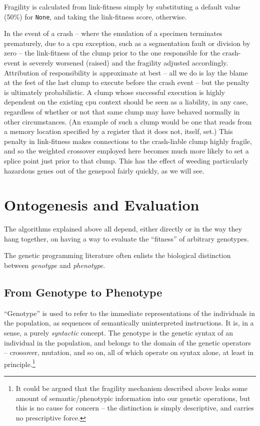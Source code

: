\documentclass[12pt,glossary]{dalthesis}
\begin{document}
Fragility is calculated from link-fitness simply by substituting a default value
(50\%) for \texttt{None}, and taking the link-fitness score, otherwise.

In the event of a crash -- where the emulation of a specimen terminates
prematurely, due to a \gls{cpu} exception, such as a segmentation fault or division by
zero -- the link-fitness of the clump prior to the one responsible for the
crash-event is severely worsened (raised) and the fragility adjusted
accordingly. Attribution of responsibility is approximate at best -- all we do
is lay the blame at the feet of the last clump to execute before the crash event
-- but the penalty is ultimately probabilistic. A clump whose successful
execution is highly dependent on the existing \gls{cpu} context should be seen as a
liability, in any case, regardless of whether or not that same clump may have
behaved normally in other circumstances. (An example of such a clump would be
one that reads from a memory location specified by a register that it does not,
itself, set.) This penalty in link-fitness makes connections to the
crash-liable clump highly fragile, and so the weighted crossover employed here
becomes much more likely to set a splice point just prior to that clump.
This has the effect of weeding particularly hazardous genes out of the genepool
fairly quickly, as we will see.

\section{Ontogenesis and Evaluation}
\label{sec:orgc008e96}
\label{org52588ea}

The algorithms explained above all depend, either directly or in the way they
hang together, on having a way to evaluate the ``fitness'' of arbitrary genotypes.

The genetic programming literature often enlists the biological distinction
between \emph{genotype} and \emph{phenotype}.

\subsection{From Genotype to Phenotype}
\label{sec:org3d48c9a}
\label{org7b725d2}

``Genotype'' is used to refer to the immediate representations of the individuals
in the population, as sequences of semantically uninterpreted instructions. It
is, in a sense, a purely \emph{syntactic} concept. The genotype is the genetic syntax
of an individual in the population, and belongs to the domain of the genetic
operators -- crossover, mutation, and so on, all of which operate on syntax alone,
at least in principle.\footnote{It could be argued that the fragility mechanism described above leaks some
  amount of semantic/phenotypic information into our genetic operations, but
  this is no cause for concern -- the distinction is simply descriptive, and
  carries no prescriptive force.}
\end{document}
